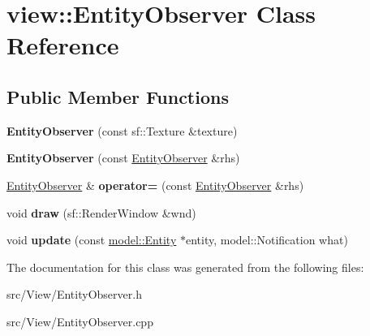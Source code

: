 \hypertarget{classview_1_1_entity_observer}{}\section{view\+:\+:Entity\+Observer Class Reference}
\label{classview_1_1_entity_observer}
\subsection*{Public Member Functions}
\begin{DoxyCompactItemize}
\item 
\mbox{\label{classview_1_1_entity_observer_a51838d2baae5885d3df7c2fa4d7a5614}} 
{\bfseries Entity\+Observer} (const sf\+::\+Texture \&texture)
\item 
\mbox{\label{classview_1_1_entity_observer_a2d2ad220164d6df80d4ed045feca7662}} 
{\bfseries Entity\+Observer} (const \mbox{\hyperlink{classview_1_1_entity_observer}{Entity\+Observer}} \&rhs)
\item 
\mbox{\label{classview_1_1_entity_observer_aa03663fe7313c694ae6c94530c376a86}} 
\mbox{\hyperlink{classview_1_1_entity_observer}{Entity\+Observer}} \& {\bfseries operator=} (const \mbox{\hyperlink{classview_1_1_entity_observer}{Entity\+Observer}} \&rhs)
\item 
\mbox{\label{classview_1_1_entity_observer_a09497faea5b09921e47b559184206c1e}} 
void {\bfseries draw} (sf\+::\+Render\+Window \&wnd)
\item 
\mbox{\label{classview_1_1_entity_observer_ac70da25c3838f89f84718f52c5cc1083}} 
void {\bfseries update} (const \mbox{\hyperlink{classmodel_1_1_entity}{model\+::\+Entity}} $\ast$entity, model\+::\+Notification what)
\end{DoxyCompactItemize}


The documentation for this class was generated from the following files\+:\begin{DoxyCompactItemize}
\item 
src/\+View/Entity\+Observer.\+h\item 
src/\+View/Entity\+Observer.\+cpp\end{DoxyCompactItemize}
